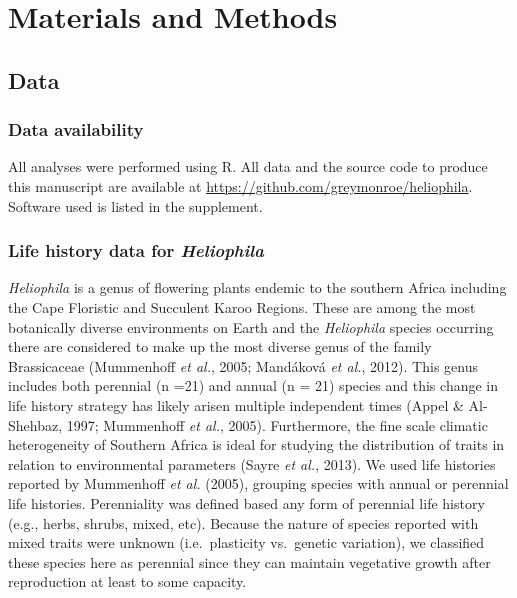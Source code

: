 \documentclass[man,floatsintext]{apa6}
\theoremstyle{definition}
\theoremstyle{definition}
\theoremstyle{definition}
\theoremstyle{remark}
\begin{document}
\hypertarget{materials-and-methods}{%
\section{Materials and Methods}\label{materials-and-methods}}

\hypertarget{data}{%
\subsection{Data}\label{data}}

\hypertarget{data-availability}{%
\subsubsection{Data availability}\label{data-availability}}

All analyses were performed using R. All data and the source code to
produce this manuscript are available at
\url{https://github.com/greymonroe/heliophila}. Software used is listed
in the supplement.

\hypertarget{life-history-data-for-heliophila}{%
\subsubsection{\texorpdfstring{Life history data for
\emph{Heliophila}}{Life history data for Heliophila}}\label{life-history-data-for-heliophila}}

\emph{Heliophila} is a genus of flowering plants endemic to the southern
Africa including the Cape Floristic and Succulent Karoo Regions. These
are among the most botanically diverse environments on Earth and the
\emph{Heliophila} species occurring there are considered to make up the
most diverse genus of the family Brassicaceae (Mummenhoff \emph{et al.},
2005; Mandáková \emph{et al.}, 2012). This genus includes both perennial
(n =21) and annual (n = 21) species and this change in life history
strategy has likely arisen multiple independent times (Appel \&
Al-Shehbaz, 1997; Mummenhoff \emph{et al.}, 2005). Furthermore, the fine
scale climatic heterogeneity of Southern Africa is ideal for studying
the distribution of traits in relation to environmental parameters
(Sayre \emph{et al.}, 2013). We used life histories reported by
Mummenhoff \emph{et al.} (2005), grouping species with annual or
perennial life histories. Perenniality was defined based any form of
perennial life history (e.g., herbs, shrubs, mixed, etc). Because the
nature of species reported with mixed traits were unknown
(i.e.~plasticity vs.~genetic variation), we classified these species
here as perennial since they can maintain vegetative growth after
reproduction at least to some capacity.
\end{document}
